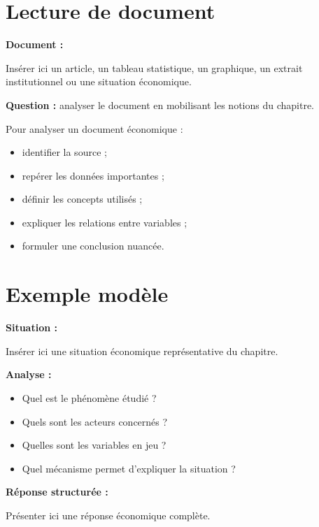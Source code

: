 \documentclass[11pt,a4paper]{article}
\begin{document}
\section{Lecture de document}

\begin{cadreenonce}
\textbf{Document :}

Insérer ici un article, un tableau statistique, un graphique, un extrait institutionnel ou une situation économique.

\medskip

\textbf{Question :} analyser le document en mobilisant les notions du chapitre.
\end{cadreenonce}

\begin{cadreaide}
Pour analyser un document économique :
\begin{itemize}
    \item identifier la source ;
    \item repérer les données importantes ;
    \item définir les concepts utilisés ;
    \item expliquer les relations entre variables ;
    \item formuler une conclusion nuancée.
\end{itemize}
\end{cadreaide}

\section{Exemple modèle}

\begin{cadreexemple}
\textbf{Situation :}

Insérer ici une situation économique représentative du chapitre.

\medskip

\textbf{Analyse :}
\begin{itemize}
    \item Quel est le phénomène étudié ?
    \item Quels sont les acteurs concernés ?
    \item Quelles sont les variables en jeu ?
    \item Quel mécanisme permet d’expliquer la situation ?
\end{itemize}

\medskip

\textbf{Réponse structurée :}

Présenter ici une réponse économique complète.
\end{cadreexemple}
\end{document}

